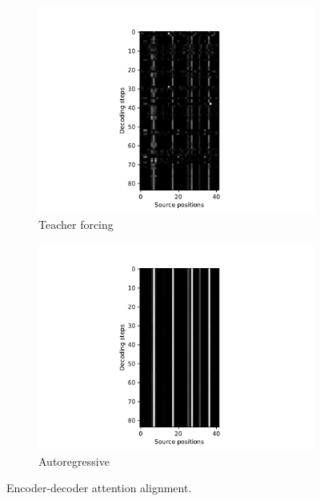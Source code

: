 \documentclass[11pt]{article}
\begin{document}
\begin{figure}
\begin{subfigure}{0.5\textwidth}
\centering
\includegraphics[width=\textwidth, trim={3cm 0 3cm 0}, clip]{image/attention_forcing.pdf}
\caption*{Teacher forcing}
\end{subfigure}%
\begin{subfigure}{0.5\textwidth}
\centering
\includegraphics[width=\textwidth, trim={3cm 0 3cm 0}, clip]{image/attention_autoreg.pdf}
\caption*{Autoregressive}
\end{subfigure}
\caption{\label{fig:att-decoder}Encoder-decoder attention alignment.}
\end{figure}

\end{document}
